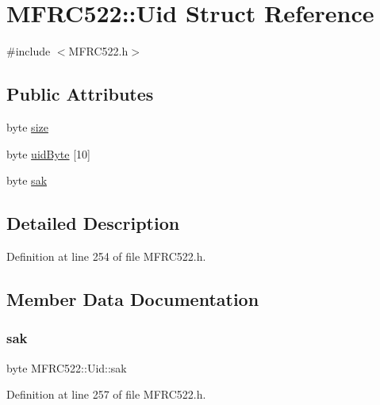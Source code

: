\hypertarget{struct_m_f_r_c522_1_1_uid}{}\section{M\+F\+R\+C522\+:\+:Uid Struct Reference}
\label{struct_m_f_r_c522_1_1_uid}


{\ttfamily \#include $<$M\+F\+R\+C522.\+h$>$}

\subsection*{Public Attributes}
\begin{DoxyCompactItemize}
\item 
byte \hyperlink{struct_m_f_r_c522_1_1_uid_a49c06f93c7748abe00a9ab5899d479b7}{size}
\item 
byte \hyperlink{struct_m_f_r_c522_1_1_uid_a5581167c1e1c8beb98c44ff86f4fbc52}{uid\+Byte} \mbox{[}10\mbox{]}
\item 
byte \hyperlink{struct_m_f_r_c522_1_1_uid_a90aa2fd57a03011252148c2ccdc8875b}{sak}
\end{DoxyCompactItemize}


\subsection{Detailed Description}


Definition at line 254 of file M\+F\+R\+C522.\+h.



\subsection{Member Data Documentation}
\mbox{\label{struct_m_f_r_c522_1_1_uid_a90aa2fd57a03011252148c2ccdc8875b}} 
\subsubsection{\texorpdfstring{sak}{sak}}
{\footnotesize\ttfamily byte M\+F\+R\+C522\+::\+Uid\+::sak}



Definition at line 257 of file M\+F\+R\+C522.\+h.

\mbox{\label{struct_m_f_r_c522_1_1_uid_a49c06f93c7748abe00a9ab5899d479b7}} 
